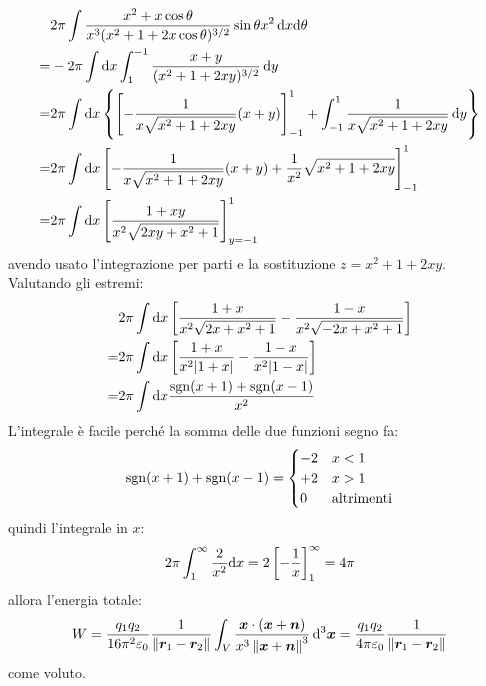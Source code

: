 \begin{equation*}
  \begin{aligned}
      & 2\pi\int \frac{x^2+x\cos\theta}{x^3(x^2+1+2x\cos\theta)^{3/2}} \sin\theta x^2\,\mathrm{d} x\mathrm{d}\theta                                       \\
    = & -2\pi\int\mathrm{d} x\int_{1}^{-1} \frac{x+y}{(x^2+1+2xy)^{3/2}} \,\mathrm{d} y                                                                   \\
    = & 2\pi\int\mathrm{d} x\left\{ \left[-\frac{1}{x\sqrt{x^2+1+2 xy}}(x+y)\right]_{-1}^1+\int_{-1}^{1}\frac{1}{x\sqrt{x^2+1+2xy}}\,\mathrm{d} y\right\} \\
    = & 2\pi\int\mathrm{d} x\left[ -\frac{1}{x\sqrt{x^2+1+2 xy}}(x+y)+\frac{1}{x^2}\sqrt{x^2+1+2x y}\right]_{-1}^1                                 \\
    = & 2\pi\int\mathrm{d} x\left[\frac{1+xy}{x^2\sqrt{2xy+x^2+1}}\right]_{y=-1}^1                                                                 \\
  \end{aligned}
\end{equation*}
avendo usato l'integrazione per parti e la sostituzione $z=x^2+1+2xy$. Valutando gli estremi:
\begin{equation*}
  \begin{aligned}
      & 2\pi\int\mathrm{d} x\left[\frac{1+x}{x^2\sqrt{2x+x^2+1}}-\frac{1-x}{x^2\sqrt{-2x+x^2+1}}\right] \\
    = & 2\pi\int\mathrm{d} x\left[\frac{1+x}{x^2|1+x|}-\frac{1-x}{x^2|1-x|}\right]                      \\
    = & 2\pi\int\mathrm{d} x\frac{\operatorname{sgn}(x+1)+\operatorname{sgn}(x-1)}{x^2}
  \end{aligned}
\end{equation*}
L'integrale è facile perché la somma delle due funzioni segno fa:
\begin{equation*}
  \operatorname{sgn}(x+1)+\operatorname{sgn}(x-1)=
  \begin{cases}
    -2 & x<1               \\
    +2 & x>1               \\
    0  & \text{altrimenti}
  \end{cases}
\end{equation*}
quindi l'integrale in $x$:
\[
  2\pi\int_1^\infty\frac{2}{x^2}\mathrm{d} x = 2\left[-\frac{1}{x}\right]_1^\infty=4\pi
\]
allora l'energia totale:
\[
  W= \frac{q_1q_2}{16\pi^2\varepsilon_0}\frac{1}{\left\lVert\boldsymbol{r}_1-\boldsymbol{r}_2\right\rVert} \int_V \frac{\boldsymbol{x}\cdot (\boldsymbol{x}+\boldsymbol{n})}{x^3\left\lVert\boldsymbol{x}+\boldsymbol{n}\right\rVert^3}\,\mathrm{d}^3\boldsymbol{x} =  \frac{q_1q_2}{4\pi\varepsilon_0}\frac{1}{\left\lVert\boldsymbol{r}_1-\boldsymbol{r}_2\right\rVert}
\]
come voluto.



